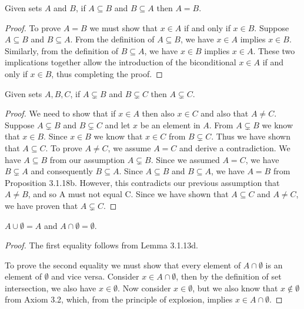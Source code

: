 \documentclass[12pt]{article}
\newenvironment{proposition}[2][Proposition]{\begin{trivlist}
\item[\hskip \labelsep {\bfseries #1}\hskip \labelsep {\bfseries #2}]}{\end{trivlist}}
\begin{document}
\begin{proposition}{3.1.18b}
	Given sets $ A $ and $ B $, if $ A \subseteq B $ and $ B \subseteq A $ then $ A = B $.
\end{proposition}
\begin{proof}
	To prove $ A = B $ we must show that $ x \in A $ if and only if $ x \in B $.
	Suppose $ A \subseteq B $ and $ B \subseteq A $.
	From the definition of $ A \subseteq B $, we have $ x \in A $ implies $ x \in B $.
	Similarly, from the definition of $ B \subseteq A $, we have $ x \in B $ implies $ x \in A $.
	These two implications together allow the introduction of the biconditional $ x \in A $ if and only if $ x \in B $, thus completing the proof.
\end{proof}

\begin{proposition}{3.1.18c}
	Given sets $ A, B, C $, if $ A \subsetneq B $ and $ B \subsetneq C $ then $ A \subsetneq C $.
\end{proposition}
\begin{proof}
	We need to show that if $ x \in A $ then also $ x \in C $ and also that $ A \neq C $.
	Suppose $ A \subsetneq B $ and $ B \subsetneq C $ and let $ x $ be an element in $ A $.
	From $ A \subsetneq B $ we know that $ x \in B $.
	Since $ x \in B $ we know that $ x \in C $ from $ B \subsetneq C $.
	Thus we have shown that $ A \subseteq C $.
	To prove $ A \neq C $, we assume $ A = C $ and derive a contradiction.
	We have $ A \subseteq B $ from our assumption $ A \subsetneq B $.
	Since we assumed $ A = C $, we have $ B \subsetneq A $ and consequently $ B \subseteq A $.
	Since $ A \subseteq B $ and $ B \subseteq A $, we have $ A = B $ from Proposition 3.1.18b.
	However, this contradicts our previous assumption that $ A \neq B $, and so A must not equal C.
	Since we have shown that $ A \subseteq C $ and $ A \neq C $, we have proven that $ A \subsetneq C $.
\end{proof}

\begin{proposition}{3.1.28a}
	$ A \cup \emptyset = A $ and $ A \cap \emptyset = \emptyset $.
\end{proposition}
\begin{proof}
	The first equality follows from Lemma 3.1.13d.
	
	To prove the second equality we must show that every element of $ A \cap \emptyset $ is an element of $ \emptyset $ and vice versa.
	Consider $ x \in A \cap \emptyset $, then by the definition of set intersection, we also have $ x \in \emptyset $.
	Now consider $ x \in \emptyset $, but we also know that $ x \notin \emptyset $ from Axiom 3.2, which, from the principle of explosion, implies $ x \in A \cap \emptyset $.
\end{proof}
\end{document}
